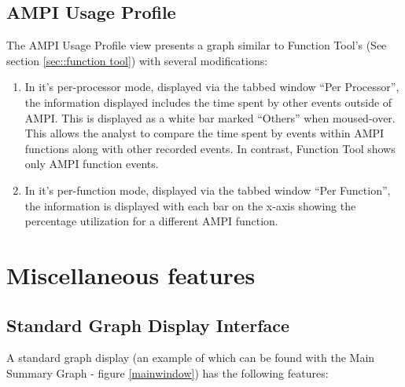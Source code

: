 \documentclass[10pt]{report}
\begin{document}

\subsection{AMPI Usage Profile}

The AMPI Usage Profile view presents a graph similar to Function
Tool's (See section \ref{sec::function tool}) with several
modifications:

\begin{enumerate}
\item In it's per-processor mode, displayed via the tabbed window
``Per Processor'', the information displayed includes the time spent
by other events outside of AMPI. This is displayed as a white bar
marked ``Others'' when moused-over. This allows the analyst to compare
the time spent by events within AMPI functions along with other
recorded events. In contrast, Function Tool shows only AMPI function
events.
\item In it's per-function mode, displayed via the tabbed window ``Per
Function'', the information is displayed with each bar on the x-axis
showing the percentage utilization for a different AMPI function.
\end{enumerate}



\section{Miscellaneous features}
\label{sec::misc}

\subsection{Standard Graph Display Interface} 

A standard graph display (an example of which can be found with the
Main Summary Graph - figure \ref{mainwindow}) has the following
features:
\end{document}

